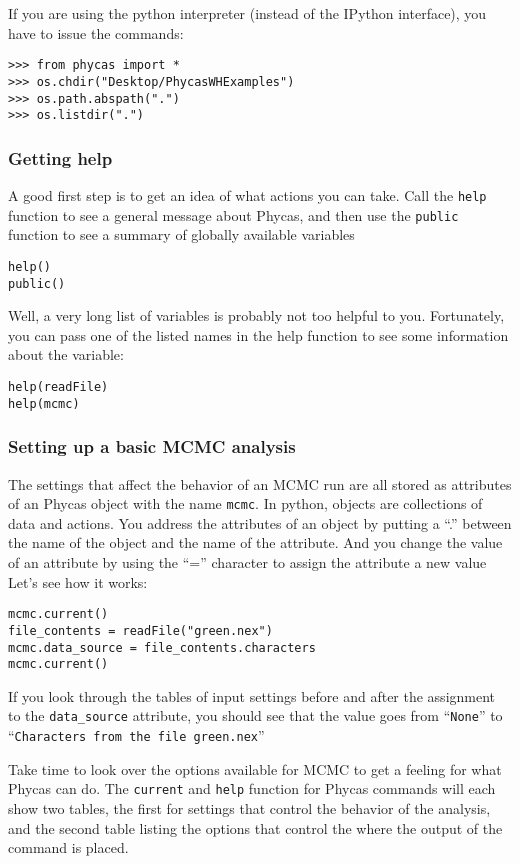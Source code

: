 \documentclass{article}
\newcommand{\cmdopt}[1]{\texttt{#1}\xspace}
\newcommand{\cmd}[1]{\texttt{#1}\xspace}
\newcommand{\phycas}{Phycas\xspace}
\begin{document}
If you are using the  python interpreter (instead of the IPython interface), you have to issue the commands:
\begin{verbatim}
>>> from phycas import *
>>> os.chdir("Desktop/PhycasWHExamples")
>>> os.path.abspath(".")
>>> os.listdir(".")
\end{verbatim}

\subsubsection{Getting help}
A good first step is to get an idea of what actions you can take. 
Call the \cmd{help} function to see a general message about \phycas, and then
use the \cmd{public} function to see a summary of globally available
variables
\begin{verbatim}
help()
public()
\end{verbatim}

Well, a very long list of variables is probably not too helpful to you.
Fortunately, you can pass one of the listed names in the help function to see 
some information about the variable:
\begin{verbatim}
help(readFile)
help(mcmc)
\end{verbatim}

\subsubsection{Setting up a basic MCMC analysis}
The settings that affect the behavior of an MCMC run are all stored
as attributes of an \phycas object with the name \cmd{mcmc}.
In python, objects are collections of data and actions.
You address the attributes of an object by putting a ``.'' between
the name of the object and the name of the attribute.
And you change the value of an attribute by using the ``='' character
to assign the attribute a new value
Let's see how it works:
\begin{verbatim}
mcmc.current()
file_contents = readFile("green.nex")
mcmc.data_source = file_contents.characters
mcmc.current()
\end{verbatim}
If you look through the tables of input settings before and after
the assignment to the \cmdopt{data\_source} attribute, you should see
that the value goes from ``\cmd{None}'' to ``\cmd{Characters from the file green.nex}''

Take time to look over the options available for MCMC to get a feeling for
what \phycas can do.
The \cmd{current} and \cmd{help} function for \phycas commands will 
each show two tables, the first for settings that control the behavior
of the analysis, and the second table listing the options that control
the where the output of the command is placed.
\end{document}
